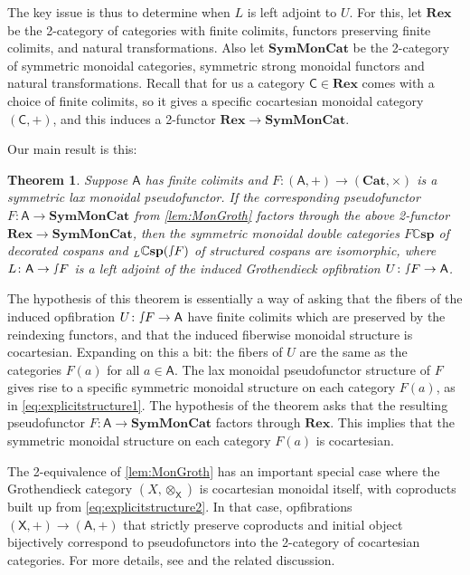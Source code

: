 \documentclass[ a4paper, onecolumn, superscriptaddress,10pt, accepted=2022-02-14, issue=3, volume=4, shorttitle=papers/compositionality-4-3 ]{compositionalityarticle}
\let\maps\colon
\newtheorem{thm}{Theorem}[section]
\newcommand{\A}{\mathsf{A}}
\newcommand{\C}{\mathsf{C}}
\newcommand{\X}{\mathsf{X}}
\newcommand{\bicat}{\mathbf}
\newcommand{\Cat}{\bicat{Cat}}
\newcommand{\Rex}{\bicat{Rex}}
\newcommand{\SMC}{\bicat{SymMonCat}}
\newcommand{\double}[1]{\mathbf{\mathbb #1}}
\newcommand{\lCsp}{\double{Csp}}
\newcommand{\inta}{\raisebox{.3\depth}{$\smallint\hspace{-.01in}$}}
\begin{document}
The key issue is thus to determine when $L$ is left adjoint to $U$.  For this, let $\Rex$ be the 2-category of categories with finite colimits, functors preserving finite colimits, and natural transformations.  Also let $\SMC$ be the 2-category of symmetric monoidal categories, symmetric strong monoidal functors and natural transformations.   Recall that for us a category $\C \in \Rex$ comes with a choice of finite colimits, so it gives a specific cocartesian monoidal category $(\C,+)$, and this induces a 2-functor $\Rex \to \SMC$.

Our main result is this:

\begin{thm} \label{thm:equiv}
Suppose $\A$ has finite colimits and $F \maps (\A,+) \to (\Cat,\times)$ is a symmetric lax monoidal pseudofunctor. If the corresponding pseudofunctor $F \maps \A \to \SMC$ from \cref{lem:MonGroth}
 factors through the above 2-functor $\Rex\to\SMC$, then the symmetric monoidal double categories $F\lCsp$ of decorated cospans and ${}_L\lCsp(\inta F)$ of structured
cospans are isomorphic, where $L \maps \A \to \inta F$ is a left adjoint of the induced Grothendieck opfibration $U \maps \inta F \to \A$.
\end{thm}

The hypothesis of this theorem is essentially a way of asking that the fibers of the induced opfibration $U \maps \inta F \to \A$ have finite colimits which are preserved by the reindexing functors, and that the induced fiberwise monoidal structure is cocartesian.   Expanding on this a bit:
the fibers of $U$ are the same as the categories $F(a)$ for all $a \in \A$.   The lax monoidal pseudofunctor structure of $F$ gives rise to a specific symmetric monoidal structure on each category $F(a)$, as in \cref{eq:explicitstructure1}.  The hypothesis of the theorem asks that the resulting pseudofunctor $F \maps \A \to \SMC$ factors through $\Rex$.  This implies
that the symmetric monoidal structure on each category $F(a)$ is cocartesian.

\iffalse
The 2-equivalence of \cref{lem:MonGroth} has an important special case where the Grothendieck category $(X,\otimes_\X)$ is cocartesian monoidal itself, with coproducts built up from \cref{eq:explicitstructure2}.  In that case, opfibrations $(\X,+) \to (\A,+)$ that strictly preserve coproducts and initial object bijectively correspond to pseudofunctors into the 2-category of cocartesian categories.  For more details, see \cite[Corollary 4.7]{MV} and the related discussion.
\end{document}
